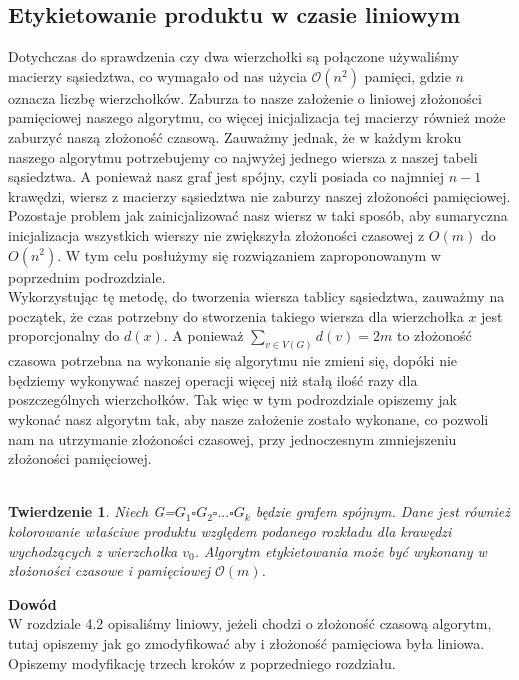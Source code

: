 \documentclass[12pt,a4paper,titlepage]{article}
\newtheorem{twr}{Twierdzenie}
\newcommand\tab[1][1cm]{\hspace*{#1}}
\begin{document}
\subsection{Etykietowanie produktu w czasie liniowym}
\tab[0.6cm]Dotychczas do sprawdzenia czy dwa wierzchołki są połączone używaliśmy macierzy sąsiedztwa, co wymagało od nas użycia $\mathcal{O}(n^2)$ pamięci, gdzie $n$ oznacza liczbę wierzchołków. Zaburza to nasze założenie o liniowej złożoności pamięciowej naszego algorytmu, co więcej inicjalizacja tej macierzy również może zaburzyć naszą złożoność czasową. Zauważmy jednak, że w każdym kroku naszego algorytmu potrzebujemy co najwyżej jednego wiersza z naszej tabeli sąsiedztwa. A ponieważ nasz graf jest spójny, czyli posiada co najmniej $n-1$ krawędzi, wiersz z macierzy sąsiedztwa nie zaburzy naszej złożoności pamięciowej. Pozostaje problem jak zainicjalizować nasz wiersz w taki sposób, aby sumaryczna inicjalizacja wszystkich wierszy nie zwiększyła złożoności czasowej z $O(m)$ do $O(n^2)$. W tym celu posłużymy się rozwiązaniem zaproponowanym w poprzednim podrozdziale.\\
\tab[0.6cm]Wykorzystując tę metodę, do tworzenia wiersza tablicy sąsiedztwa, zauważmy na początek, że czas potrzebny do stworzenia takiego wiersza dla wierzchołka $x$ jest proporcjonalny do $d(x)$. A ponieważ $\sum_{v \in V(G)}d(v) = 2m$ to złożoność czasowa potrzebna na wykonanie się algorytmu nie zmieni się, dopóki nie będziemy wykonywać naszej operacji więcej niż stałą ilość razy dla poszczególnych wierzchołków. Tak więc w tym podrozdziale opiszemy jak wykonać nasz algorytm tak, aby nasze założenie zostało wykonane, co pozwoli nam na utrzymanie złożoności czasowej, przy jednoczesnym zmniejszeniu złożoności pamięciowej.\\
\\
\begin{twr}Niech G=$G_1 \square G_2 \square ... \square G_k$ będzie grafem spójnym. Dane jest również kolorowanie właściwe produktu względem podanego rozkładu dla krawędzi wychodzących z wierzchołka $v_0$. Algorytm etykietowania może być wykonany w złożoności czasowe i pamięciowej $\mathcal{O}(m)$.
\end{twr}
\tab[-0.6cm]\textbf{Dowód}\\ 
\tab[0.6cm]W rozdziale 4.2 opisaliśmy liniowy, jeżeli chodzi o złożoność czasową algorytm, tutaj opiszemy jak go zmodyfikować aby i złożoność pamięciowa była liniowa. Opiszemy modyfikację trzech kroków z poprzedniego rozdziału.\\
\end{document}
